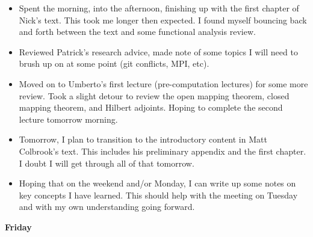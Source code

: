 \documentclass[12pt,a4paper]{article}
\begin{document}
    \begin{itemize}
        \item Spent the morning, into the afternoon, finishing up with the first chapter of Nick's text. This took me longer then expected. I found myself bouncing back and forth between the text and some functional analysis review. 
        \item Reviewed Patrick's research advice, made note of some topics I will need to brush up on at some point (git conflicts, MPI, etc).
        \item Moved on to Umberto's first lecture (pre-computation lectures) for some more review. Took a slight detour to review the open mapping theorem, closed mapping theorem, and Hilbert adjoints. Hoping to complete the second lecture tomorrow morning.
        \item Tomorrow, I plan to transition to the introductory content in Matt Colbrook's text. This includes his preliminary appendix and the first chapter. I doubt I will get through all of that tomorrow. 
        \item Hoping that on the weekend and/or Monday, I can write up some notes on key concepts I have learned. This should help with the meeting on Tuesday and with my own understanding going forward.
    \end{itemize}


\textbf{Friday}
    
\end{document}
